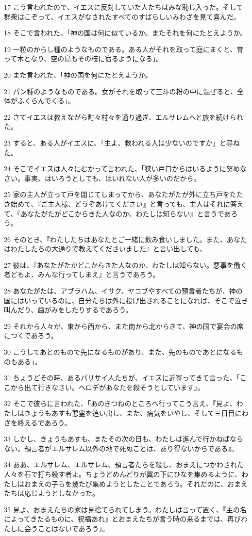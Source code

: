 \par 17 こう言われたので、イエスに反対していた人たちはみな恥じ入った。そして群衆はこぞって、イエスがなされたすべてのすばらしいみわざを見て喜んだ。
\par 18 そこで言われた、「神の国は何に似ているか。またそれを何にたとえようか。
\par 19 一粒のからし種のようなものである。ある人がそれを取って庭にまくと、育って木となり、空の鳥もその枝に宿るようになる」。
\par 20 また言われた、「神の国を何にたとえようか。
\par 21 パン種のようなものである。女がそれを取って三斗の粉の中に混ぜると、全体がふくらんでくる」。
\par 22 さてイエスは教えながら町々村々を通り過ぎ、エルサレムへと旅を続けられた。
\par 23 すると、ある人がイエスに、「主よ、救われる人は少ないのですか」と尋ねた。
\par 24 そこでイエスは人々にむかって言われた、「狭い戸口からはいるように努めなさい。事実、はいろうとしても、はいれない人が多いのだから。
\par 25 家の主人が立って戸を閉じてしまってから、あなたがたが外に立ち戸をたたき始めて、『ご主人様、どうぞあけてください』と言っても、主人はそれに答えて、『あなたがたがどこからきた人なのか、わたしは知らない』と言うであろう。
\par 26 そのとき、『わたしたちはあなたとご一緒に飲み食いしました。また、あなたはわたしたちの大通りで教えてくださいました』と言い出しても、
\par 27 彼は、『あなたがたがどこからきた人なのか、わたしは知らない。悪事を働く者どもよ、みんな行ってしまえ』と言うであろう。
\par 28 あなたがたは、アブラハム、イサク、ヤコブやすべての預言者たちが、神の国にはいっているのに、自分たちは外に投げ出されることになれば、そこで泣き叫んだり、歯がみをしたりするであろう。
\par 29 それから人々が、東から西から、また南から北からきて、神の国で宴会の席につくであろう。
\par 30 こうしてあとのもので先になるものがあり、また、先のものであとになるものもある」。
\par 31 ちょうどその時、あるパリサイ人たちが、イエスに近寄ってきて言った、「ここから出て行きなさい。ヘロデがあなたを殺そうとしています」。
\par 32 そこで彼らに言われた、「あのきつねのところへ行ってこう言え、『見よ、わたしはきょうもあすも悪霊を追い出し、また、病気をいやし、そして三日目にわざを終えるであろう。
\par 33 しかし、きょうもあすも、またその次の日も、わたしは進んで行かねばならない。預言者がエルサレム以外の地で死ぬことは、あり得ないからである』。
\par 34 ああ、エルサレム、エルサレム、預言者たちを殺し、おまえにつかわされた人々を石で打ち殺す者よ。ちょうどめんどりが翼の下にひなを集めるように、わたしはおまえの子らを幾たび集めようとしたことであろう。それだのに、おまえたちは応じようとしなかった。
\par 35 見よ、おまえたちの家は見捨てられてしまう。わたしは言って置く、『主の名によってきたるものに、祝福あれ』とおまえたちが言う時の来るまでは、再びわたしに会うことはないであろう」。


